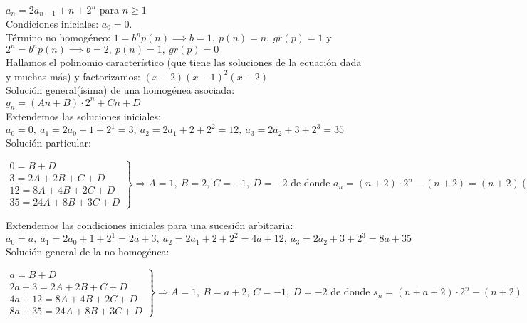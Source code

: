 \begin{ejemplo} $a_{n} = 2a_{n-1} + n + 2^n$ para $n \geq 1$ \\
    Condiciones iniciales: $a_{0} = 0$.\\
    Término no homogéneo: $1 = b^np(n) \implies b = 1, \ p(n) = n, \ gr(p) = 1$ y $2^n = b^np(n) \implies b = 2, \ p(n) = 1, \ gr(p) = 0$ \\
    Hallamos el polinomio característico (que tiene las soluciones de la ecuación dada y muchas más) y factorizamos: $(x-2)(x-1)^2(x-2)$\\
    Solución general(ísima) de una homogénea asociada: $g_{n} = (An + B) \cdot 2^n + Cn + D$ \\
    Extendemos las soluciones iniciales: $a_0 = 0, \ a_1 = 2a_0 +1 +2^1 = 3, \ a_2 = 2a_1 +2 +2^2 = 12, \ a_3 = 2a_2 +3 +2^3 = 35$ \\
    Solución particular:
    \begin{center}
        $\left.
            \begin{aligned}
                0 = B + D             \\
                3 = 2A + 2B + C + D   \\
                12 = 8A + 4B + 2C + D \\
                35 = 24A + 8B + 3C + D
            \end{aligned} \right \}
            \Rightarrow A = 1, \ B = 2, \ C = -1, \ D = -2 \text{ de donde } a_n = (n+2)\cdot 2^n - (n+2) = (n+2)(2^n-1)$
    \end{center}
    Extendemos las condiciones iniciales para una sucesión arbitraria: $a_0 = a, \ a_1 = 2a_0 +1 +2^1 = 2a+3, \ a_2 = 2a_1 +2 +2^2 = 4a+12, \ a_3 = 2a_2 +3 +2^3 = 8a+35$ \\
    Solución general  de la no homogénea:
    \begin{center}
        $\left.
            \begin{aligned}
                a = B + D                \\
                2a+3 = 2A + 2B + C + D   \\
                4a+12 = 8A + 4B + 2C + D \\
                8a+35 = 24A + 8B + 3C + D
            \end{aligned} \right \}
            \Rightarrow A = 1, \ B = a+2, \ C = -1, \ D = -2 \text{ de donde } s_n = (n+a+2)\cdot 2^n - (n+2)$
    \end{center}
\end{ejemplo}

